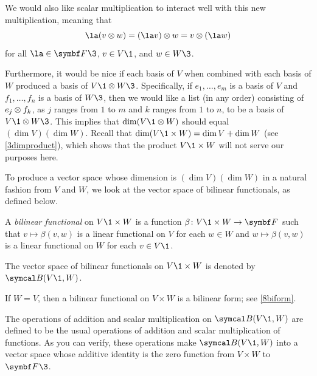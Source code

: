 
We would also like scalar multiplication to interact well with this new multiplication, meaning that
\[
\la (v \tensor w) = (\la v) \tensor w = v \tensor (\la w)
\]
for all $\la \in \F{}\3$, $v \in V\1$, and $w \in W\3$.

Furthermore, it would be nice if each basis of $V$ when combined with each basis of $W$ produced a basis of $V\1 \tensor W\3$. Specifically, if $e_1, \ldots, e_m$ is a basis of $V$ and $f_1, \ldots, f_n$ is a basis of $W\3$, then we would like a list (in any order) consisting of $e_j \otimes f_k$, as $j$ ranges from $1$ to $m$ and $k$ ranges from $1$ to $n$, to be a basis of
$V\1 \tensor W\3$. This implies that $\dim (V\1 \tensor W)$ should equal $(\dim V)(\dim W)$. Recall that
$\dim(V\1 \times W) = \dim V + \dim W$ (see \ref{3dimproduct}), which shows that the product $V\1 \times W$ will not serve our purposes here.

To produce a vector space whose dimension is $(\dim V)(\dim W)$ in a natural fashion from $V$ and $W$, we look at the vector space of bilinear functionals, as defined below.

{\begin{Itemize}
\item
A \emph{bilinear functional} on $V\1 \times W$ is a function $\fun \beta {V\1 \times W} {\F{}}$ such that $v \mapsto \beta(v, w)$
is a linear functional on $V$ for each $w\in W$ and
$w \mapsto \beta(v, w)$ is a linear functional on $W$ for each $v \in V\1$.
\item
The vector space of bilinear functionals on $V\1 \times W$ is denoted by $\B(V\1,W)$.
\end{Itemize}}

If $W = V$, then a bilinear functional on $V \times W$ is a bilinear form; see \ref{8biform}.

The operations of addition and scalar multiplication on $\B(V\1, W)$ are defined to be the usual operations of addition and scalar multiplication of functions. As you can verify, these operations make $\B(V\1,W)$ into a vector space whose additive identity is the zero function from $V \times W$ to $\F{}\3$.

